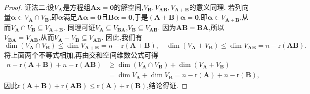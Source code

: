 \documentclass[lang=cn,newtx,10pt,scheme=chinese]{elegantbook}
\begin{document}
\begin{proof}
{\color{blue}证法二:}设\(V_{\boldsymbol{A}}\)是方程组\(\boldsymbol{A}\boldsymbol{x}=\boldsymbol{0}\)的解空间,\(V_{\boldsymbol{B}},V_{\boldsymbol{A}\boldsymbol{B}},V_{\boldsymbol{A}+\boldsymbol{B}}\)的意义同理. 若列向量\(\boldsymbol{\alpha}\in V_{\boldsymbol{A}}\cap V_{\boldsymbol{B}}\),即\(\boldsymbol{\alpha}\)满足\(\boldsymbol{A}\boldsymbol{\alpha}=\boldsymbol{0}\)且\(\boldsymbol{B}\boldsymbol{\alpha}=\boldsymbol{0}\),于是\((\boldsymbol{A}+\boldsymbol{B})\boldsymbol{\alpha}=\boldsymbol{0}\),即\(\boldsymbol{\alpha}\in V_{\boldsymbol{A}+\boldsymbol{B}}\),从而\(V_{\boldsymbol{A}}\cap V_{\boldsymbol{B}}\subseteq V_{\boldsymbol{A}+\boldsymbol{B}}\). 同理可证\(V_{\boldsymbol{A}}\subseteq V_{\boldsymbol{B}\boldsymbol{A}}\),\(V_{\boldsymbol{B}}\subseteq V_{\boldsymbol{A}\boldsymbol{B}}\). 因为\(\boldsymbol{A}\boldsymbol{B}=\boldsymbol{B}\boldsymbol{A}\),所以\(V_{\boldsymbol{B}\boldsymbol{A}} = V_{\boldsymbol{A}\boldsymbol{B}}\),从而\(V_{\boldsymbol{A}}+V_{\boldsymbol{B}}\subseteq V_{\boldsymbol{A}\boldsymbol{B}}\). 因此,我们有
\[
\dim(V_{\boldsymbol{A}}\cap V_{\boldsymbol{B}})\leq\dim V_{\boldsymbol{A}+\boldsymbol{B}}=n - \mathrm{r}(\boldsymbol{A}+\boldsymbol{B}),\quad\dim(V_{\boldsymbol{A}}+V_{\boldsymbol{B}})\leq\dim V_{\boldsymbol{A}\boldsymbol{B}}=n - \mathrm{r}(\boldsymbol{A}\boldsymbol{B}).
\]
将上面两个不等式相加,再由交和空间维数公式可得
\begin{align*}
n - \mathrm{r}(\boldsymbol{A}+\boldsymbol{B})+n - \mathrm{r}(\boldsymbol{A}\boldsymbol{B})&\geq\dim(V_{\boldsymbol{A}}\cap V_{\boldsymbol{B}})+\dim(V_{\boldsymbol{A}}+V_{\boldsymbol{B}})\\
&=\dim V_{\boldsymbol{A}}+\dim V_{\boldsymbol{B}}=n - \mathrm{r}(\boldsymbol{A})+n - \mathrm{r}(\boldsymbol{B}),
\end{align*}
因此\(\mathrm{r}(\boldsymbol{A}+\boldsymbol{B})+\mathrm{r}(\boldsymbol{A}\boldsymbol{B})\leq\mathrm{r}(\boldsymbol{A})+\mathrm{r}(\boldsymbol{B})\),结论得证.


\end{proof}
\end{document}
